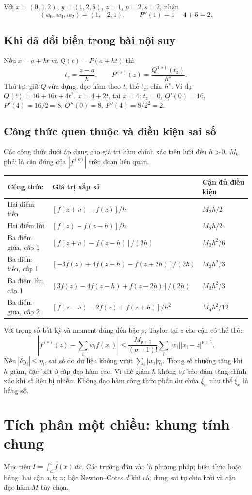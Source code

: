 Với $x=(0,1,2)$, $y=(1,2,5)$, $z=1$, $p=2,s=2$, nhận
\[
(w_0,w_1,w_2)=(1,-2,1),\qquad P''(1)=1-4+5=2.
\]

\subsection{Khi đã đổi biến trong bài nội suy}
Nếu $x=a+ht$ và $Q(t)=P(a+ht)$ thì
\[
t_z=\frac{z-a}{h},\qquad P^{(s)}(z)=\frac{Q^{(s)}(t_z)}{h^s}.
\]
Thứ tự: giữ $Q$ vừa dựng; đạo hàm theo $t$; thế $t_z$; chia $h^s$. Ví dụ $Q(t)=16+16t+4t^2$, $x=4+2t$, tại $x=4$: $t_z=0$, $Q'(0)=16$, $P'(4)=16/2=8$; $Q''(0)=8$, $P''(4)=8/2^2=2$.

\subsection{Công thức quen thuộc và điều kiện sai số}
Các công thức dưới áp dụng cho giá trị hàm chính xác trên lưới đều $h>0$. $M_k$ phải là cận đúng của $|f^{(k)}|$ trên đoạn liên quan.
\begin{center}\small
\begin{tabular}{p{}p{}p{}}
\toprule Công thức&Giá trị xấp xỉ&Cận đủ điều kiện\\\midrule
Hai điểm tiến&$[f(z+h)-f(z)]/h$&$M_2h/2$\\
Hai điểm lùi&$[f(z)-f(z-h)]/h$&$M_2h/2$\\
Ba điểm giữa, cấp 1&$[f(z+h)-f(z-h)]/(2h)$&$M_3h^2/6$\\
Ba điểm tiến, cấp 1&$[-3f(z)+4f(z+h)-f(z+2h)]/(2h)$&$M_3h^2/3$\\
Ba điểm lùi, cấp 1&$[3f(z)-4f(z-h)+f(z-2h)]/(2h)$&$M_3h^2/3$\\
Ba điểm giữa, cấp 2&$[f(z-h)-2f(z)+f(z+h)]/h^2$&$M_4h^2/12$\\\bottomrule
\end{tabular}\end{center}
Với trọng số bất kỳ và moment đúng đến bậc $p$, Taylor tại $z$ cho cận có thể thô:
\[
\left|f^{(s)}(z)-\sum_iw_if(x_i)\right|
\le\frac{M_{p+1}}{(p+1)!}\sum_i|w_i||x_i-z|^{p+1}.
\]
Nếu $|\delta y_i|\le\eta_i$, sai số do dữ liệu không vượt $\sum_i|w_i|\eta_i$. Trọng số thường tăng khi $h$ giảm, đặc biệt ở cấp đạo hàm cao. Vì thế giảm $h$ không tự bảo đảm tăng chính xác khi số liệu bị nhiễu. Không đạo hàm công thức phần dư chứa $\xi_x$ như thể $\xi_x$ là hằng số.

\section{Tích phân một chiều: khung tính chung}
\label{sec:quadrature-framework}
Mục tiêu $I=\int_a^bf(x)\,dx$. Các trường đầu vào là phương pháp; biểu thức hoặc bảng; hai cận $a,b$; $n$; bậc Newton--Cotes $d$ khi có; dung sai tự chia lưới và cận đạo hàm $M$ tùy chọn.

